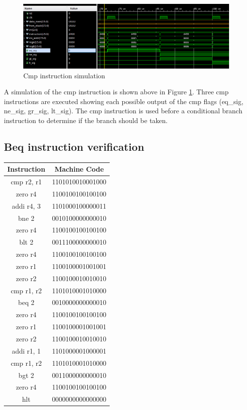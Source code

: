 \documentclass{article}
\begin{document}
		\begin{figure}[H]
			\centering
			\includegraphics[width=7in]{img/cmpinstb.png}
			\caption{Cmp instruction simulation}
			\label{fig:cmpinstb}
		\end{figure}
		
		\begin{par}
			A simulation of the cmp instruction is shown above in Figure \ref{fig:cmpinstb}. Three cmp instructions are executed showing each possible output of the cmp flags (eq\_sig, ne\_sig, gr\_sig, lt\_sig). The cmp instruction is used before a conditional branch instruction to determine if the branch should be taken. 
		\end{par}
		\newpage
		
	\subsection{Beq instruction verification}
	\vspace{.5cm}
	\begin{center}
		\begin{tabular}{|c|c|}
			\hline 
			\textbf{Instruction} & \textbf{Machine Code} \\ 
			\hline 
			cmp r2, r1 & 1101010010001000 \\ 
			zero r4 & 1100100100100100 \\
			addi r4, 3 & 1101000100000011 \\
			bne		2 & 0010100000000010 \\
			zero	r4 & 1100100100100100 \\
			blt		2 & 0011100000000010 \\
			zero	r4 & 1100100100100100 \\
			zero	r1 & 1100100001001001 \\
			zero	r2 & 1100100010010010 \\
			cmp		r1, r2 & 1101010001010000 \\
			beq		2 & 0010000000000010 \\
			zero	r4 & 1100100100100100 \\
			zero	r1 & 1100100001001001 \\
			zero	r2 & 1100100010010010 \\
			addi	r1, 1 & 1101000001000001 \\
			cmp		r1, r2 & 1101010001010000 \\
			bgt		2 & 0011000000000010 \\
			zero	r4 & 1100100100100100 \\
			hlt & 0000000000000000 \\
			\hline 
		\end{tabular} 
	\end{center}
	
\end{document}
